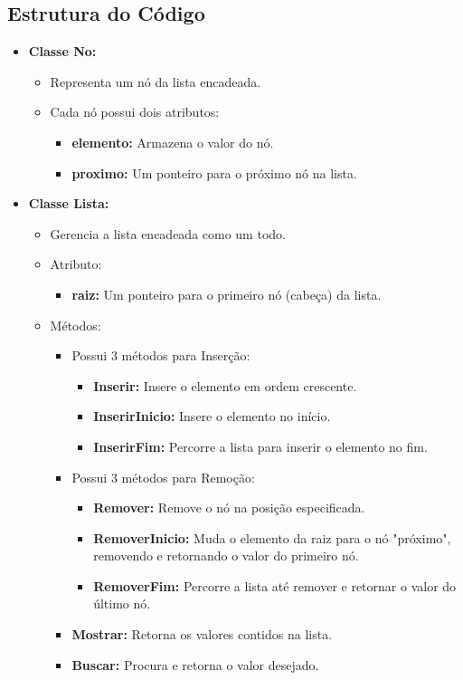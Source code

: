 \documentclass{article}
\begin{document}
\subsection*{Estrutura do Código}
\begin{itemize}
    \item \textbf{Classe No:}
    \begin{itemize}
        \item Representa um nó da lista encadeada.
        \item Cada nó possui dois atributos:
        \begin{itemize}
            \item \textbf{elemento:} Armazena o valor do nó.
            \item \textbf{proximo:} Um ponteiro para o próximo nó na lista.
        \end{itemize}
    \end{itemize}
    \item \textbf{Classe Lista:}
    \begin{itemize}
        \item Gerencia a lista encadeada como um todo.
        \item Atributo:
        \begin{itemize}
            \item \textbf{raiz:} Um ponteiro para o primeiro nó (cabeça) da lista.
        \end{itemize}
        \item Métodos:
        \begin{itemize}
            \item Possui 3 métodos para Inserção:
            \begin{itemize}
                \item \textbf{Inserir:} Insere o elemento em ordem crescente.
                \item \textbf{InserirInicio:} Insere o elemento no início.
                \item \textbf{InserirFim:} Percorre a lista para inserir o elemento no fim.
            \end{itemize}
            \item Possui 3 métodos para Remoção:
            \begin{itemize}
                \item \textbf{Remover:} Remove o nó na posição especificada.
                \item \textbf{RemoverInicio:} Muda o elemento da raiz para o nó "próximo", removendo e retornando o valor do primeiro nó.
                \item \textbf{RemoverFim:} Percorre a lista até remover e retornar o valor do último nó.
            \end{itemize}
            \item \textbf{Mostrar:} Retorna os valores contidos na lista.
            \item \textbf{Buscar:} Procura e retorna o valor desejado.
        \end{itemize}
    \end{itemize}
\end{itemize}
\end{document}
